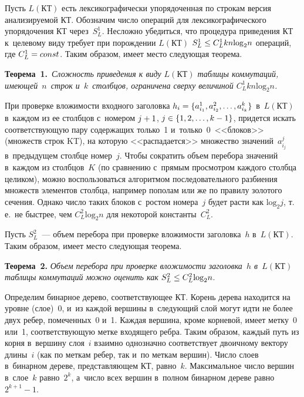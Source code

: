 \begin{multicols}{2}
  Пусть $L(\mathrm{КТ})$ есть лексикографически упорядоченная по строкам версия 
анализируемой КТ. Обозначим число операций для лексикографического 
упорядочения КТ через~$S_L^1$. Несложно убедиться, что процедура 
приведения КТ к~целевому виду требует при порождении $L(\mathrm{КТ})$ $S_L^1 
\hm\leq C_L^1 kn \mathrm{log}_2 n$ операций, где $C_L^1\hm= const$. Таким 
образом, имеет место следующая теорема. 
  
  \smallskip
  
  \noindent
  \textbf{Теорема~1.}\ \textit{Сложность приведения к виду $L(\mathrm{КТ})$ таб\-ли\-цы 
коммутаций, име\-ющей~$n$~строк и~$k$~столбцов, ограничена сверху величиной 
$C_L^1kn \mathrm{log}_2 n$.}
  
  \smallskip
  
  При проверке вложимости входного заголовка $h_i\hm= \{a^1_{i_1}, 
a^2_{i_2},\ldots , a^k_{i_k}\}$ в~$L(\mathrm{КТ})$ в~каждом из ее столбцов с~номером 
$j\hm+1$, $j\hm\in\{1, 2, \ldots, k-1\}$, придется искать соответствующую пару 
содержащих только~1 и~только~0~<<блоков>> (множеств строк KT), на 
которую <<распадается>> множество значений~$a^j_{i_j}$ в~предыду\-щем 
столбце номер~$j$. Чтобы сократить объем перебора значений в~каждом из 
столбцов~$K$ (по сравнению с~прямым просмотром каждого столбца целиком), 
можно воспользоваться алгоритмом последовательного разбиения множеств 
элементов столбца, например пополам или же по правилу золотого сечения. 
Однако число таких блоков с~рос\-том номера~$j$ будет расти как 
$\mathrm{log}_2 j$, т.\,е.\ не быстрее, чем $C_L^2\mathrm{log}_2 n$ для 
некоторой константы~$C_L^2$. 
  
  Пусть $S_L^2$~--- объем перебора при проверке вложимости заголовка~$h$ 
в~$L(\mathrm{КТ})$. Таким образом, имеет место следующая теорема.
  
  \smallskip
  
  \noindent
  \textbf{Теорема~2.} \textit{Объем перебора при проверке вложимости 
заголовка~$h$ в~$L(\mathrm{КТ})$  таблицы коммутаций можно оценить как} 
$S_L^2\hm\leq C_L^2 \mathrm{log}_2 n$.
  
  \smallskip
  
  Определим бинарное дерево, соответствующее КТ. Корень дерева находится 
на уровне (слое)~0, и~из каждой вершины в~следующий слой могут идти не 
более двух ребер, помеченных~0 и~1. Каждая вершина, кроме корневой, имеет 
метку~0 или~1, соответствующую метке входящего ребра. Таким образом, 
каждый путь из корня в~вершину слоя~$i$ взаимно однозначно соответствует 
двоичному вектору длины~$i$ (как по меткам ребер, так и~по меткам вершин). 
Число слоев в~бинарном дереве, пред\-став\-ля\-ющем КТ, равно~$k$. 
Максимальное число вершин в~слое~$k$ равно~$2^k$, а~число всех вершин 
в~полном бинарном дереве равно $2^{k+1}-1$. 
  

\end{multicols}
